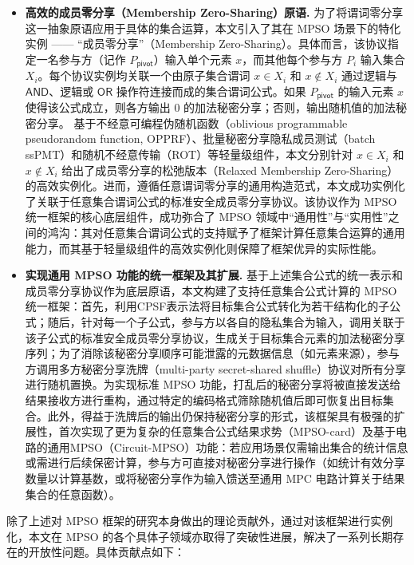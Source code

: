 \begin{itemize}
    \item \textbf{高效的成员零分享（Membership Zero-Sharing）原语.} 为了将谓词零分享这一抽象原语应用于具体的集合运算，本文引入了其在 MPSO 场景下的特化实例 —— “成员零分享”（Membership Zero-Sharing）。具体而言，该协议指定一名参与方（记作 $P_\mathsf{pivot}$）输入单个元素 $x$，而其他每个参与方 $P_i$ 输入集合 $X_i$。每个协议实例均关联一个由原子集合谓词 $x \in X_i$ 和 $x \notin X_i$ 通过逻辑与 $\mathsf{AND}$、逻辑或 $\mathsf{OR}$ 操作符连接而成的集合谓词公式。如果 $P_\mathsf{pivot}$ 的输入元素 $x$ 使得该公式成立，则各方输出 0 的加法秘密分享；否则，输出随机值的加法秘密分享。
    基于不经意可编程伪随机函数（oblivious programmable pseudorandom function, OPPRF）、批量秘密分享隐私成员测试（batch ssPMT）和随机不经意传输（ROT）等轻量级组件，本文分别针对 $x \in X_i$ 和 $x \notin X_i$ 给出了成员零分享的松弛版本（Relaxed Membership Zero-Sharing）的高效实例化。进而，遵循任意谓词零分享的通用构造范式，本文成功实例化了关联于任意集合谓词公式的标准安全成员零分享协议。该协议作为 MPSO 统一框架的核心底层组件，成功弥合了 MPSO 领域中“通用性”与“实用性”之间的鸿沟：其对任意集合谓词公式的支持赋予了框架计算任意集合运算的通用能力，而其基于轻量级组件的高效实例化则保障了框架优异的实际性能。

    \item \textbf{实现通用 MPSO 功能的统一框架及其扩展.} 基于上述集合公式的统一表示和成员零分享协议作为底层原语，本文构建了支持任意集合公式计算的 MPSO 统一框架：首先，利用CPSF表示法将目标集合公式转化为若干结构化的子公式；随后，针对每一个子公式，参与方以各自的隐私集合为输入，调用关联于该子公式的标准安全成员零分享协议，生成关于目标集合元素的加法秘密分享序列；为了消除该秘密分享顺序可能泄露的元数据信息（如元素来源），参与方调用多方秘密分享洗牌（multi-party secret-shared shuffle）协议对所有分享进行随机置换。为实现标准 MPSO 功能，打乱后的秘密分享将被直接发送给结果接收方进行重构，通过特定的编码格式筛除随机值后即可恢复出目标集合。此外，得益于洗牌后的输出仍保持秘密分享的形式，该框架具有极强的扩展性，首次实现了更为复杂的任意集合公式结果求势（MPSO-card）及基于电路的通用MPSO（Circuit-MPSO）功能：若应用场景仅需输出集合的统计信息或需进行后续保密计算，参与方可直接对秘密分享进行操作（如统计有效分享数量以计算基数，或将秘密分享作为输入馈送至通用 MPC 电路计算关于结果集合的任意函数）。
\end{itemize}

除了上述对 MPSO 框架的研究本身做出的理论贡献外，通过对该框架进行实例化，本文在 MPSO 的各个具体子领域亦取得了突破性进展，解决了一系列长期存在的开放性问题。具体贡献点如下：

